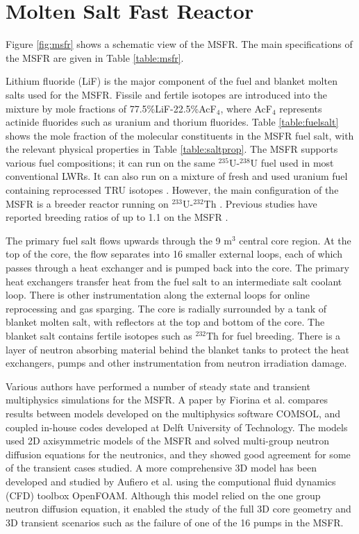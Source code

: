\documentclass{anstrans}
\begin{document}
\section{Molten Salt Fast Reactor}

	Figure \ref{fig:msfr} shows a schematic view of the \gls{MSFR}. The main
	specifications of the \gls{MSFR} are given in Table \ref{table:msfr}.

	Lithium fluoride (LiF) is the major component of the fuel and blanket
	molten salts used for the \gls{MSFR}. Fissile and fertile isotopes are
	introduced
	into the mixture by mole fractions of 77.5\%LiF-22.5\%AcF$_4$, where
	AcF$_4$ represents actinide fluorides such as uranium and thorium
	fluorides. Table \ref{table:fuelsalt} shows the mole fraction of the
	molecular constituents in the \gls{MSFR} fuel salt, with the relevant
	physical properties in Table \ref{table:saltprop}.
	The \gls{MSFR} supports various fuel compositions; it can run on the same 
	$^{235}$U-$^{238}$U fuel used in most conventional LWRs. It can also run
	on a
	mixture of fresh and used uranium fuel containing reprocessed TRU
	isotopes \cite{fiorina_investigation_2013}. However, the main configuration
	of the \gls{MSFR} is a breeder reactor running on $^{233}$U-$^{232}$Th
	\cite{merle-lucotte_launching_2011}. Previous studies have reported
	breeding ratios of up to 1.1 on the \gls{MSFR} \cite{fiorina_molten_2013}. 

	The primary fuel salt flows upwards through the 9 m$^3$ central core
	region. At the top of the core, the flow separates into 16 smaller external
	loops, each of which passes through a heat exchanger and is pumped back
	into the core. The primary heat exchangers transfer heat from the fuel salt 
	to an intermediate salt coolant loop. There is other instrumentation along
	the external loops for online reprocessing and gas sparging. The core is
	radially surrounded by a tank of blanket molten salt, with reflectors at
	the top and bottom of the core. The blanket salt contains fertile isotopes
	such as $^{232}$Th for fuel breeding. There is a layer of neutron absorbing
	material behind the blanket tanks to protect the heat exchangers, pumps and
	other instrumentation from neutron irradiation damage.

	Various authors have performed a number of steady state and transient
	multiphysics simulations for the \gls{MSFR}. A paper by Fiorina et al.
	\cite{fiorina_modelling_2014} compares results between models
	developed on the multiphysics software COMSOL, and coupled in-house codes
	developed at
	Delft University of Technology. The models used 2D axisymmetric models of
	the \gls{MSFR} and solved multi-group neutron diffusion equations for the
	neutronics, and they showed good agreement for some of the transient cases
	studied. A more comprehensive 3D model has been developed and studied by
	Aufiero et al. \cite{aufiero_development_2014} using the computional fluid
	dynamics (CFD) toolbox OpenFOAM. Although this model relied on the one
	group neutron diffusion equation, it enabled the study of the full 3D core
	geometry and 3D transient scenarios such as the failure of one of the 16
	pumps in the \gls{MSFR}.
\end{document}
